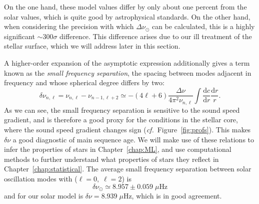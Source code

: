 On the one hand, these model values differ by only about one percent from the solar values, which is quite good by astrophysical standards. 
On the other hand, when considering the precision with which ${\Delta\nu_{\odot}}$ can be calculated, this is a highly significant ${\sim 300\sigma}$ difference. 
This difference arises due to our ill treatment of the stellar surface, which we will address later in this section. 

A higher-order expansion of the asymptotic expression additionally gives a term known as the \emph{small frequency separation}, the spacing between modes adjacent in frequency and whose spherical degree differs by two: 
\begin{equation} \label{eq:dnu}
    \delta\nu_{n,\ell}
    =
    \nu_{n,\ell}
    -
    \nu_{n-1,\ell+2}
    \simeq
    -(4\ell + 6)
    \frac{\Delta\nu}{4\pi^2 \nu_{n,\ell}}
    \int
        \frac{\text{d}c}{\text{d}r}
        \frac{\text{d}r}{r}.
\end{equation}
As we can see, the small frequency separation is sensitive to the sound speed gradient, and is therefore a good proxy for the conditions in the stellar core, where the sound speed gradient changes sign (\emph{cf.}~Figure~\ref{fig:profs}). 
This makes ${\delta\nu}$ a good diagnostic of main sequence age. 
We will make use of these relations to infer the properties of stars in Chapter~\ref{chap:ML}, and use computational methods to further understand what properties of stars they reflect in Chapter~\ref{chap:statistical}. 
The average small frequency separation between solar oscillation modes with (${\ell=0},\;{\ell=2}$) is
\begin{equation}
    \delta\nu_\odot \simeq 8.957 \pm 0.059\;\mu\text{Hz}
\end{equation}
and for our solar model is ${\delta\nu=8.939\;\mu\text{Hz}}$, which is in good agreement. 



